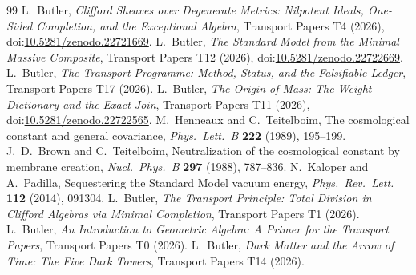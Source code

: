 \documentclass[11pt]{article}
\theoremstyle{definition}
\theoremstyle{plain}
\begin{document}
\begin{thebibliography}{99}
 L.~Butler,
\emph{Clifford Sheaves over Degenerate Metrics: Nilpotent Ideals, One-Sided Completion, and the Exceptional Algebra},
Transport Papers T4 (2026), doi:\href{https://doi.org/10.5281/zenodo.22721669}{10.5281/zenodo.22721669}.
 L.~Butler,
\emph{The Standard Model from the Minimal Massive Composite},
Transport Papers T12 (2026), doi:\href{https://doi.org/10.5281/zenodo.22722669}{10.5281/zenodo.22722669}.
 L.~Butler,
\emph{The Transport Programme: Method, Status, and the Falsifiable Ledger},
Transport Papers T17 (2026).
 L.~Butler,
\emph{The Origin of Mass: The Weight Dictionary and the Exact Join},
Transport Papers T11 (2026), doi:\href{https://doi.org/10.5281/zenodo.22722565}{10.5281/zenodo.22722565}.
 M.~Henneaux and C.~Teitelboim,
The cosmological constant and general covariance,
\emph{Phys.\ Lett.\ B} \textbf{222} (1989), 195--199.
 J.~D.~Brown and C.~Teitelboim,
Neutralization of the cosmological constant by membrane creation,
\emph{Nucl.\ Phys.\ B} \textbf{297} (1988), 787--836.
 N.~Kaloper and A.~Padilla,
Sequestering the Standard Model vacuum energy,
\emph{Phys.\ Rev.\ Lett.} \textbf{112} (2014), 091304.
 L.~Butler,
\emph{The Transport Principle: Total Division in Clifford Algebras via Minimal Completion},
Transport Papers T1 (2026).
 L.~Butler,
\emph{An Introduction to Geometric Algebra: A Primer for the Transport Papers},
Transport Papers T0 (2026).
 L.~Butler,
\emph{Dark Matter and the Arrow of Time: The Five Dark Towers},
Transport Papers T14 (2026).
\end{thebibliography}
\end{document}
